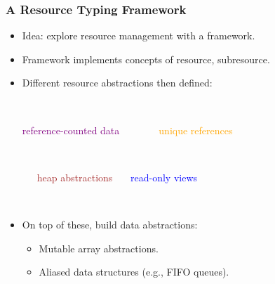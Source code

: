 \documentclass[10pt]{beamer}
\begin{document}
\begin{frame}
\frametitle{A Resource Typing Framework}
\begin{itemize}
\item Idea: explore resource management with a framework.
\item Framework implements concepts of resource, subresource.
\item Different resource abstractions then defined:

\ 

\textcolor{purple}{reference-counted data}\ \ \ \ \ \ \ \ \textcolor{orange}{unique references}


\ 

\ \ \ \textcolor{brown}{heap abstractions} \ \ \ \textcolor{blue}{read-only views}

\ 

\item On top of these, build data abstractions:

\begin{itemize}
\item Mutable array abstractions.
\item Aliased data structures (e.g., FIFO queues). 
\end{itemize}

\end{itemize}
\end{frame}
\end{document}
